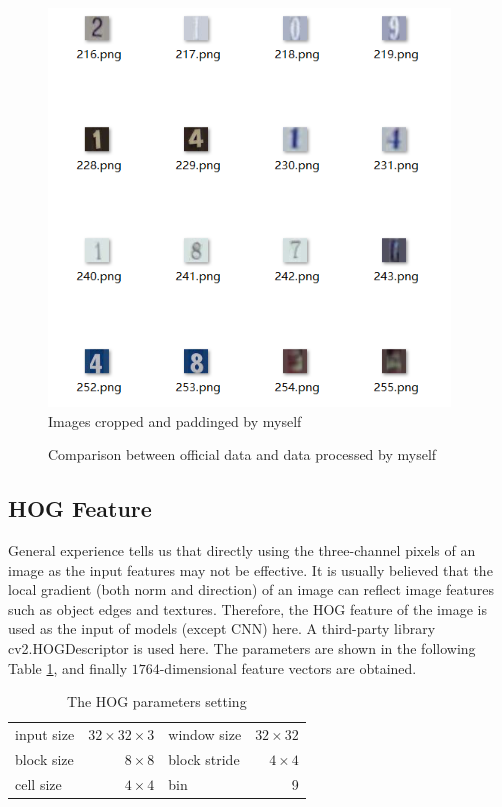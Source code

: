\documentclass{article}
\begin{document}
\begin{figure}[H]
\begin{minipage}{0.32\textwidth}
        \includegraphics[width=0.95\textwidth]{fig/3.png}
        Images cropped and paddinged by myself
    \end{minipage}
    \caption{Comparison between official data and data processed by myself}
    \label{datasetimage}
\end{figure}
\subsection{HOG Feature}
General experience tells us that directly using the three-channel pixels of an image as the input features may not be effective. It is usually believed that the local gradient (both norm and direction) of an image can 
reflect image features such as object edges and textures. Therefore, the HOG feature of the image is used as the input of models (except CNN) here. A third-party library cv2.HOGDescriptor is used here. The parameters are 
shown in the following Table \ref{hogparam}, and finally $1764$-dimensional feature vectors are obtained.
\begin{table}[H]
    \centering
    \caption{The HOG parameters setting}
    \label{hogparam}
    \begin{tabular}{|lr|lr|}
        \hline
        input size& $32\times 32\times 3$&window size&$32\times 32$\\
        block size& $8\times 8$&block stride& $4\times 4$\\
        cell size & $4\times 4$& bin & 9\\
        \hline
    \end{tabular}
\end{table}
\end{document}
